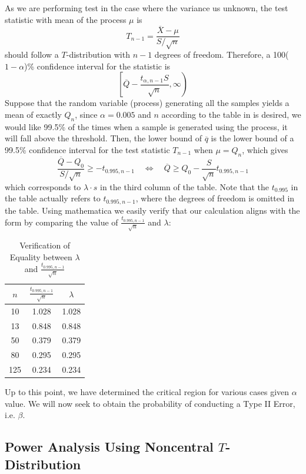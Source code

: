\documentclass[12pt]{article}
\begin{document}
As we are performing test in the case where the variance us unknown, the test statistic with mean of the process $\mu$ is 
$$
T_{n-1} = \dfrac{\overline{X} - \mu}{S/\sqrt{n}}
$$
should follow a $T$-distribution with $n-1$ degrees of freedom. Therefore, a 100($1-\alpha$)\% confidence interval for the statistic is
$$
\left[\overline{Q}-\dfrac{t_{\alpha,n-1}S}{\sqrt{n}},\infty\right)
$$
Suppose that the random variable (process) generating all the samples yields a mean of exactly $Q_n$, since $\alpha = 0.005$ and $n$ according to the table in \cite{JJF2005} is desired, we would like 99.5\% of the times when a sample is generated using the process, it will fall above the threshold. Then, the lower bound of $\overline{q}$ is the lower bound of a 99.5\% confidence interval for the test statistic $T_{n-1}$ when $\mu = Q_n$, which gives
$$
\dfrac{\overline{Q} - Q_0}{S/\sqrt{n}} \geq -t_{0.995, n-1} \quad\Leftrightarrow\quad \overline{Q}\geq Q_0-\dfrac{S}{\sqrt{n}}t_{0.995, n-1}
$$ 
which corresponds to $\lambda\cdot s$ in the third column of the table. Note that the $t_{0.995}$ in the table actually refers to $t_{0.995, n-1}$, where the degrees of freedom is omitted in the table. Using mathematica we easily verify that our calculation aligns with the form by comparing the value of $\frac{t_{0.995, n-1}}{\sqrt{n}}$ and $\lambda$:

\begin{table}[htbp]
    \centering
    \begin{tabular}{ccc}
        \toprule
        $n$ & $\frac{t_{0.995, n-1}}{\sqrt{n}}$ & $\lambda$ \\
        \midrule
        10 & 1.028 & 1.028 \\
        13 & 0.848 & 0.848 \\
        50 & 0.379 & 0.379 \\
        80 & 0.295 & 0.295 \\
        125 & 0.234 & 0.234 \\
        \bottomrule
    \end{tabular}
    \caption{Verification of Equality between $\lambda$ and $\frac{t_{0.995, n-1}}{\sqrt{n}}$}
\end{table}

Up to this point, we have determined the critical region for various cases given $\alpha$ value. We will now seek to obtain the probability of conducting a Type II Error, i.e. $\beta$.

\subsection{Power Analysis Using Noncentral $T$-Distribution}
\end{document}

